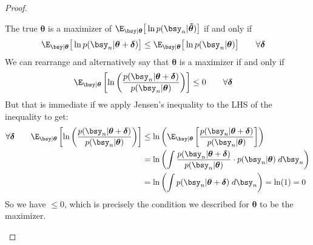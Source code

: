 \documentclass[12pt]{article}
\theoremstyle{plain}
\theoremstyle{definition}
\theoremstyle{remark}
\newcommand{\bstheta}{\boldsymbol{\theta}}
\newcommand{\bsdelta}{\boldsymbol{\delta}}
\newcommand{\bstildetheta}{\boldsymbol{\tilde{\theta}}}
\begin{document}
\begin{proof}
\begin{enumerate}[label=(\roman*)]
    The true $\bstheta$ is a maximizer of
    $\E_{\bsy|\bstheta}\big[\ln p(\bsy_n|\bstildetheta)\big]$ if and
    only if
    \begin{align*}
      \E_{\bsy|\bstheta}\big[\ln p(\bsy_n|\bstheta+\bsdelta)\big]
      &\leq
      \E_{\bsy|\bstheta}\big[\ln p(\bsy_n|\bstheta)\big]
      \qquad\forall \bsdelta
    \end{align*}
    We can rearrange and alternatively say that $\bstheta$ is a
    maximizer if and only if
    \begin{align*}
      \E_{\bsy|\bstheta}\left[
        \ln\left(\frac{p(\bsy_n|\bstheta + \bsdelta)}{p(\bsy_n|\bstheta)}\right)
      \right]
      &\leq 0
      \qquad\forall \bsdelta
    \end{align*}
    But that is immediate if we apply Jensen's inequality to the LHS of
    the inequality to get:
    \begin{align*}
      \forall\bsdelta\qquad
      \E_{\bsy|\bstheta}\left[
        \ln\left(\frac{p(\bsy_n|\bstheta + \bsdelta)}{p(\bsy_n|\bstheta)}\right)
      \right]
      &\leq
      \ln \left(
      \E_{\bsy|\bstheta}\left[
        \frac{p(\bsy_n|\bstheta + \bsdelta)}{p(\bsy_n|\bstheta)}
      \right]
      \right)
      \\
      &=
      \ln \left(
      \int
      \frac{p(\bsy_n|\bstheta + \bsdelta)}{p(\bsy_n|\bstheta)}
      \cdot p(\bsy_n|\bstheta)
      \; d\bsy_n
      \right) \\
      &=
      \ln \left(
      \int
      p(\bsy_n|\bstheta + \bsdelta)
      \; d\bsy_n
      \right)
      = \ln(1) = 0
    \end{align*}
    So we have $\leq 0$, which is precisely the condition we described
    for $\bstheta$ to be the maximizer.


\end{enumerate}
\end{proof}
\end{document}
